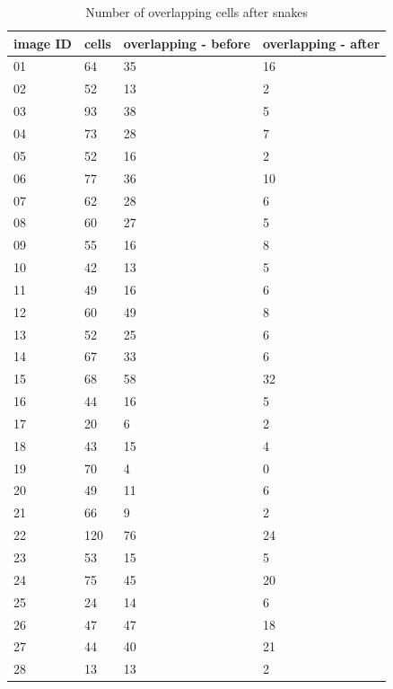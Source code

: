 \begin{table}
	\centering
	\begin{center}

	\caption{Number of overlapping cells after snakes}
	\label{tab:Snakes}
	\begin{tabular}{|p{2cm}|p{2cm}|p{2cm}|p{2cm}|}
	\textbf{image ID} & cells &  overlapping - before &  overlapping - after \\
	\hline 
	\hline 
	01 & 64 & 35 & 16 \\
	02 & 52 & 13 & 2 \\
	03 & 93 & 38 & 5 \\
	04 & 73 & 28 & 7 \\
	05 & 52 & 16 & 2 \\
	06 & 77 & 36 & 10 \\
	07 & 62 & 28 & 6 \\
	08 & 60 & 27 & 5 \\
	09 & 55 & 16 & 8 \\
	10 & 42 & 13 & 5 \\
	11 & 49 & 16 & 6 \\
	12 & 60 & 49 & 8 \\
	13 & 52 & 25 & 6 \\
	14 & 67 & 33 & 6 \\ 
	15 & 68 & 58 & 32 \\
	16 & 44 & 16 & 5 \\
	17 & 20 & 6 & 2 \\
	18 & 43 & 15 & 4 \\
	19 & 70 & 4 & 0 \\
	20 & 49 & 11 & 6 \\
	21 & 66 & 9 & 2 \\
	22 & 120 & 76 & 24 \\
	23 & 53 & 15 & 5 \\
	24 & 75 & 45 & 20 \\
	25 & 24 & 14 & 6 \\
	26 & 47 & 47 & 18 \\
	27 & 44 & 40 & 21 \\
	28 & 13 & 13 & 2 \\
	\hline
	\end{tabular}
	\end{center}
\end{table}

